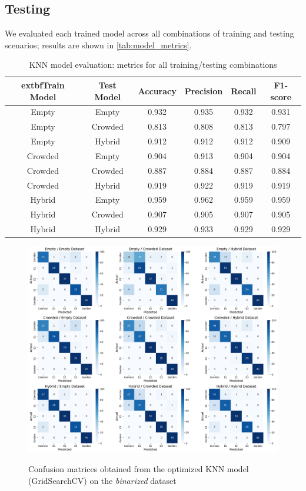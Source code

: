 \documentclass{article}
\begin{document}
\subsection{Testing}
We evaluated each trained model across all combinations of training and testing scenarios; results are shown in \autoref{tab:model_metrics}.
\begin{table}[ht!]
    \centering

    \begin{tabular}{c c c c c c }
        \hline
         	extbf{Train Model} & \textbf{Test Model} & Accuracy & Precision & Recall & F1-score \\
        \hline
        Empty   & Empty   & 0.932 & 0.935 & 0.932 & 0.931 \\
        Empty   & Crowded & 0.813 & 0.808 & 0.813 & 0.797 \\
        Empty   & Hybrid  & 0.912 & 0.912 & 0.912 & 0.909 \\
        Crowded & Empty   & 0.904 & 0.913 & 0.904 & 0.904 \\
        Crowded & Crowded & 0.887 & 0.884 & 0.887 & 0.884 \\
        Crowded & Hybrid  & 0.919 & 0.922 & 0.919 & 0.919 \\
        Hybrid  & Empty   & 0.959 & 0.962 & 0.959 & 0.959 \\
        Hybrid  & Crowded & 0.907 & 0.905 & 0.907 & 0.905 \\
        Hybrid  & Hybrid  & 0.929 & 0.933 & 0.929 & 0.929 \\
        \hline
    \end{tabular}
    \caption{KNN model evaluation: metrics for all training/testing combinations}
    \label{tab:model_metrics}
\end{table}

\begin{figure}[ht!]
    \centering
    {\includegraphics[scale=0.39]{img/MCGSCV.png}}
    \caption{Confusion matrices obtained from the optimized KNN model (GridSearchCV) on the \textit{binarized} dataset}
    \label{MCGtid}
\end{figure} 
\end{document}
